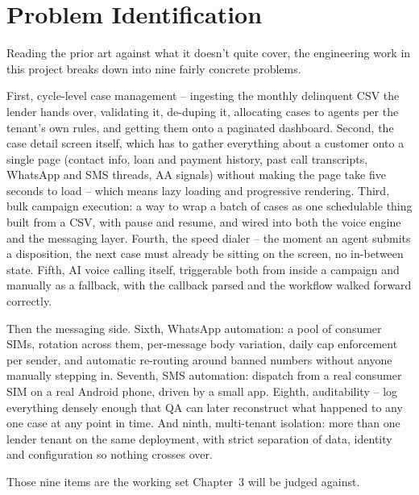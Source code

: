 \section{Problem Identification}
Reading the prior art against what it doesn't quite cover, the engineering work in this project breaks down into nine fairly concrete problems.

First, cycle-level case management -- ingesting the monthly delinquent CSV the lender hands over, validating it, de-duping it, allocating cases to agents per the tenant's own rules, and getting them onto a paginated dashboard. Second, the case detail screen itself, which has to gather everything about a customer onto a single page (contact info, loan and payment history, past call transcripts, WhatsApp and SMS threads, AA signals) without making the page take five seconds to load -- which means lazy loading and progressive rendering. Third, bulk campaign execution: a way to wrap a batch of cases as one schedulable thing built from a CSV, with pause and resume, and wired into both the voice engine and the messaging layer. Fourth, the speed dialer -- the moment an agent submits a disposition, the next case must already be sitting on the screen, no in-between state. Fifth, AI voice calling itself, triggerable both from inside a campaign and manually as a fallback, with the callback parsed and the workflow walked forward correctly.

Then the messaging side. Sixth, WhatsApp automation: a pool of consumer SIMs, rotation across them, per-message body variation, daily cap enforcement per sender, and automatic re-routing around banned numbers without anyone manually stepping in. Seventh, SMS automation: dispatch from a real consumer SIM on a real Android phone, driven by a small app. Eighth, auditability -- log everything densely enough that QA can later reconstruct what happened to any one case at any point in time. And ninth, multi-tenant isolation: more than one lender tenant on the same deployment, with strict separation of data, identity and configuration so nothing crosses over.

Those nine items are the working set Chapter~3 will be judged against.

